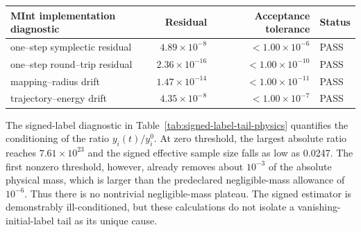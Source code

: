 \documentclass[
  11pt,
  letterpaper,
  onehalfspacing,
  normalmargins,
  equalmargins,
  oneside
]{ut-thesis}
\begin{document}
\begin{center}
\small
\begin{tabular}{L{0.43\textwidth}rrl}
\toprule
MInt implementation diagnostic & Residual & Acceptance tolerance & Status \\
\midrule
one--step symplectic residual & $4.89\times10^{-8}$ & $<1.00\times10^{-6}$ & PASS \\
one--step round--trip residual & $2.36\times10^{-16}$ & $<1.00\times10^{-10}$ & PASS \\
mapping--radius drift & $1.47\times10^{-14}$ & $<1.00\times10^{-11}$ & PASS \\
trajectory--energy drift & $4.35\times10^{-8}$ & $<1.00\times10^{-7}$ & PASS \\
\bottomrule
\end{tabular}
\end{center}

The signed-label diagnostic in Table~\ref{tab:signed-label-tail-physics}
quantifies the conditioning of the ratio \(y_i(t)/y_i^0\). At zero threshold,
the largest absolute ratio reaches \(7.61\times10^{23}\) and the signed
effective sample size falls as low as 0.0247. The first nonzero threshold,
however, already removes about \(10^{-3}\) of the absolute physical mass,
which is larger than the predeclared negligible-mass allowance of \(10^{-6}\).
Thus there is no nontrivial negligible-mass plateau. The signed estimator is
demonstrably ill-conditioned, but these calculations do not isolate a
vanishing-initial-label tail as its unique cause.
\end{document}
